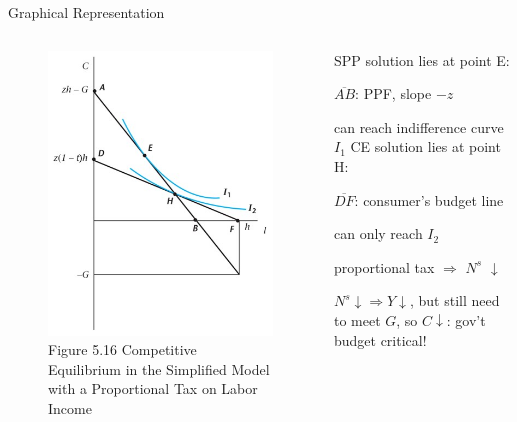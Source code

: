 \documentclass[11pt,aspectratio=169,usenames,dvipsnames]{beamer}
\let\tempone\itemize
\let\temptwo\enditemize
\renewenvironment{itemize}{\tempone\addtolength{\itemsep}{\fill}}{\temptwo}
\begin{document}
\begin{frame}{Graphical Representation}
\label{slide:Graphical_Representation}
    \begin{columns}
        \begin{column}{0.5\textwidth}
            \begin{figure}
                \caption{\scriptsize Figure 5.16  Competitive Equilibrium in the Simplified Model with a Proportional Tax on Labor Income}
                \includegraphics[width=.7\textwidth]{./figures/Figure_5_16.jpg}
            \end{figure}
        \end{column}
        \begin{column}{0.5\textwidth}
            SPP solution lies at point E:
            \begin{itemize}
                \item $\overline{AB}$: PPF, slope  $ -z $
                \item can reach indifference curve $ I_{1} $
            \end{itemize}
            CE solution lies at point H:
            \begin{itemize}
                \item $\overline{DF}$: consumer’s budget line
                \item can only reach $ I_{2} $
                \item proportional tax $ \Rightarrow  $ $ N^{s} $ $ \downarrow  $
                \item $ N^{s} $$ \downarrow $$ \Rightarrow $$ Y $$\downarrow  $, but still need to meet $ G $, so $ C \downarrow  $: gov’t budget critical!
            \end{itemize}
        \end{column}
    \end{columns}
\end{frame}
\end{document}
